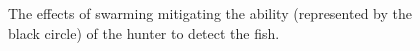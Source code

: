\documentclass[
reprint,
showpacs,preprintnumbers,
amsmath,amssymb,
prl,
]{revtex4-1}
\begin{document}
\begin{figure}[!htp] %
		\label{fig:swarming}
		\label{fig:noswarming}
		
	\caption{The effects of swarming mitigating the ability (represented by the black circle) of the hunter to detect the fish.\cite{underwatervision}}

	\label{fig:swarmblindness}
\end{figure}
\end{document}

